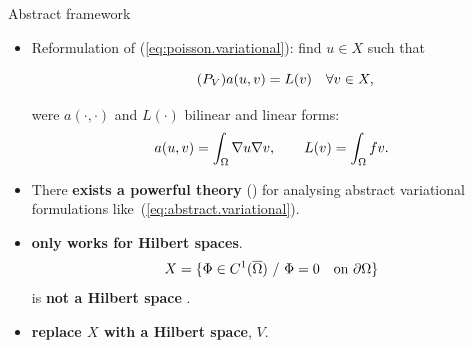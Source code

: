 \begin{frame}{Abstract framework}
  \begin{itemize}
  \item Reformulation of (\ref{eq:poisson.variational}): find
    $u\in X$ such that
    \begin{BlockNoTitle}
      \begin{equation}
        \tag{\ensuremath{P_V}}
        a(u,v) = L(v) \quad \forall v\in
        X,\label{eq:abstract.variational}
      \end{equation}
    \end{BlockNoTitle}
    were $a(\cdot,\cdot)$ and $L(\cdot)$  bilinear and linear forms:
    \begin{equation*}
      a(u,v) = \int_\Omega \nabla u \nabla v, \qquad
      L(v) = \int_\Omega f  v.
    \end{equation*}

  \item There \alert{\textbf{exists a powerful theory}}
    () for analysing abstract variational
    formulations like~(\ref{eq:abstract.variational}).

  \item {} \textbf{only works for Hilbert spaces}. 
    $$
    X=\{ \Phi\in C^1(\overline\Omega) \ / \  \Phi=0 \quad \mbox{on } \partial\Omega\}
    $$
    is \textbf{not a Hilbert space} .
  \item {} \alert{\textbf{replace $X$ with a Hilbert space}, $V$}.
  \end{itemize}
\end{frame}

